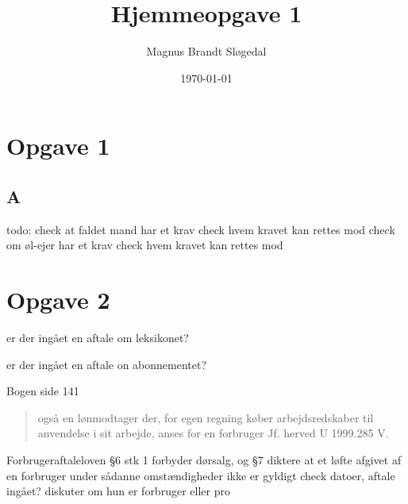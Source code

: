 \documentclass[11pt, a4paper]{article}
\title{Hjemmeopgave 1}
\author{Magnus Brandt Sløgedal}
\date{\today}
\begin{document}
\maketitle
\section{Opgave 1}
\subsection*{A}
todo:
check at faldet mand har et krav
check hvem kravet kan rettes mod
check om øl-ejer har et krav
check hvem kravet kan rettes mod

\section{Opgave 2}
er der ingået en aftale om leksikonet?

er der ingået en aftale on abonnementet?

Bogen side 141 \begin{quote}
også en lønmodtager der, for egen regning køber
arbejdsredskaber til anvendelse i sit arbejde, anses for en forbruger Jf.
herved U 1999.285 V.
\end{quote}


Forbrugeraftaleloven §6 stk 1 forbyder dørsalg, og §7 diktere at et løfte
afgivet af en forbruger under sådanne omstændigheder ikke er gyldigt
check
datoer, aftale ingået? diskuter om hun er forbruger eller pro
\end{document}
